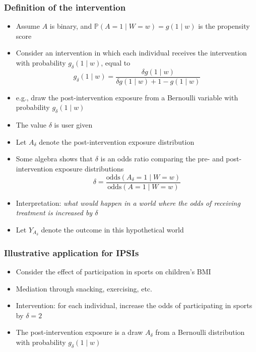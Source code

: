 \documentclass[
  12pt,
]{book}
\providecommand{\tightlist}{%
  \setlength{\itemsep}{0pt}\setlength{\parskip}{0pt}}
\theoremstyle{definition}
\theoremstyle{definition}
\theoremstyle{definition}
\renewcommand{\P}{\mathbb{P}}
\newcommand{\1}{\mathbbm{1}}
\begin{document}
\hypertarget{definition-of-the-intervention}{%
\subsubsection*{Definition of the intervention}\label{definition-of-the-intervention}}


\begin{itemize}
\tightlist
\item
  Assume \(A\) is binary, and \(\P(A=1\mid W=w) = g(1\mid w)\) is the propensity score
\item
  Consider an intervention in which each individual receives the intervention
  with probability \(g_\delta(1\mid w)\), equal to
  \begin{equation*}
    g_\delta(1\mid w)=\frac{\delta g(1\mid w)}{\delta g(1\mid w) +
    1 - g(1\mid w)}
  \end{equation*}
\item
  e.g., draw the post-intervention exposure from a Bernoulli variable with
  probability \(g_\delta(1\mid w)\)
\item
  The value \(\delta\) is user given
\item
  Let \(A_\delta\) denote the post-intervention exposure distribution
\item
  Some algebra shows that \(\delta\) is an odds ratio comparing the pre- and
  post-intervention exposure distributions
  \begin{equation*}
    \delta = \frac{\text{odds}(A_\delta = 1\mid W=w)}
    {\text{odds}(A = 1\mid W=w)}
  \end{equation*}
\item
  Interpretation: \emph{what would happen in a
  world where the odds of receiving treatment is increased by \(\delta\)}
\item
  Let \(Y_{A_\delta}\) denote the outcome in this hypothetical world
\end{itemize}

\hypertarget{illustrative-application-for-ipsis}{%
\subsubsection{Illustrative application for IPSIs}\label{illustrative-application-for-ipsis}}

\begin{itemize}
\tightlist
\item
  Consider the effect of participation in sports on children's BMI
\item
  Mediation through snacking, exercising, etc.
\item
  Intervention: for each individual, increase the odds of participating in
  sports by \(\delta=2\)
\item
  The post-intervention exposure is a draw \(A_\delta\) from a Bernoulli
  distribution with probability \(g_\delta(1\mid w)\)
\end{itemize}
\end{document}
